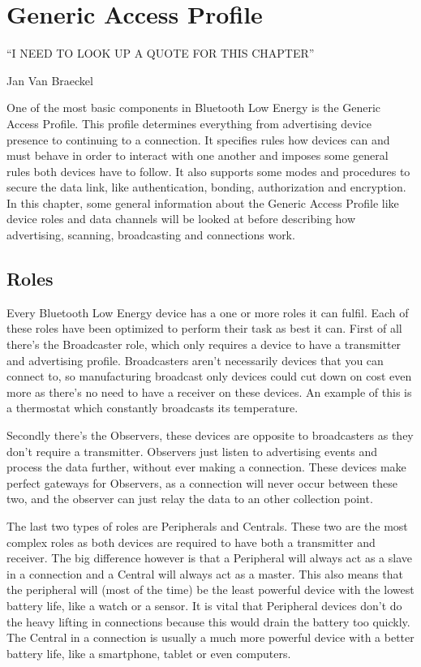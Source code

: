 \documentclass[pdftex,a4paper,12pt,twoside]{report}
\begin{document}
\chapter{Generic Access Profile}
\label{ch:gap}
\epigraph{``I NEED TO LOOK UP A QUOTE FOR THIS CHAPTER''}{Jan Van Braeckel}
One of the most basic components in Bluetooth Low Energy is the Generic Access Profile. This profile determines everything from advertising device presence to continuing to a connection. It specifies rules how devices can and must behave in order to interact with one another and imposes some general rules both devices have to follow. It also supports some modes and procedures to secure the data link, like authentication, bonding, authorization and encryption. In this chapter, some general information about the Generic Access Profile like device roles and data channels will be looked at before describing how advertising, scanning, broadcasting and connections work.

\newpage{}

\section{Roles}
\label{sec:roles}
Every Bluetooth Low Energy device has a one or more roles it can fulfil. Each of these roles have been optimized to perform their task as best it can. First of all there's the Broadcaster role, which only requires a device to have a transmitter and advertising profile. Broadcasters aren't necessarily devices that you can connect to, so manufacturing broadcast only devices could cut down on cost even more as there's no need to have a receiver on these devices. An example of this is a thermostat which constantly broadcasts its temperature.

Secondly there's the Observers, these devices are opposite to broadcasters as they don't require a transmitter. Observers just listen to advertising events and process the data further, without ever making a connection. These devices make perfect gateways for Observers, as a connection will never occur between these two, and the observer can just relay the data to an other collection point.

The last two types of roles are Peripherals and Centrals. These two are the most complex roles as both devices are required to have both a transmitter and receiver. The big difference however is that a Peripheral will always act as a slave in a connection and a Central will always act as a master. This also means that the peripheral will (most of the time) be the least powerful device with the lowest battery life, like a watch or a sensor. It is vital that Peripheral devices don't do the heavy lifting in connections because this would drain the battery too quickly. The Central in a connection is usually a much more powerful device with a better battery life, like a smartphone, tablet or even computers.
\end{document}
